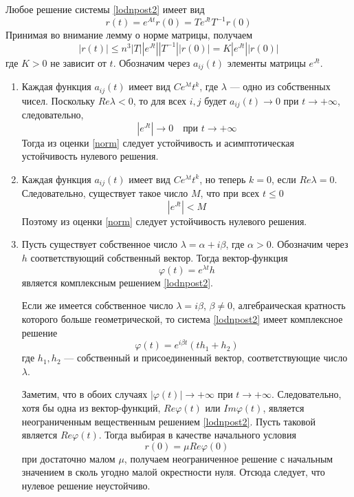 Любое решение системы \eqref{lodnpost2} имеет вид
\begin{equation*}
    r(t) = e^{At}r(0) = Te^{Jt}T^{-1}r(0)
\end{equation*}
Принимая во внимание лемму о норме матрицы, получаем
\begin{equation}
    |r(t)| \le n^3 |T||e^{Jt}||T^{-1}||r(0)| = K |e^{Jt}||r(0)| \label{norm}
\end{equation}
где $K > 0$ не зависит от $t$. Обозначим через $a_{ij}(t)$ элементы матрицы $e^{Jt}$.
\begin{enumerate}
    \item Каждая функция $a_{ij}(t)$ имеет вид $Ce^{\lambda t}t^k$, где $\lambda$ --- одно из собственных чисел. Поскольку $Re \lambda < 0$, то для всех $i, j$ будет $a_{ij}(t) \to 0$ при $t \to +\infty$, следовательно,
          \begin{equation*}
              |e^{Jt}| \to 0 \quad \text{при } t \to +\infty
          \end{equation*}
          Тогда из оценки \eqref{norm} следует устойчивость и асимптотическая устойчивость нулевого решения.
    \item Каждая функция $a_{ij}(t)$ имеет вид $Ce^{\lambda t}t^k$, но теперь $k = 0$, если $Re \lambda = 0$. Следовательно, существует такое число $M$, что при всех $t \le 0$
          \begin{equation*}
              |e^{Jt}| < M
          \end{equation*}
          Поэтому из оценки \eqref{norm} следует устойчивость нулевого решения.
    \item Пусть существует собственное число $\lambda = \alpha + i\beta$, где $\alpha > 0$. Обозначим через $h$ соответствующий собственный вектор. Тогда вектор-функция
          \begin{equation*}
              \varphi(t) = e^{\lambda t}h
          \end{equation*}
          является комплексным решением \eqref{lodnpost2}.

          Если же имеется собственное число $\lambda = i\beta$, $\beta \neq 0$, алгебраическая кратность которого больше геометрической, то система \eqref{lodnpost2} имеет комплексное решение
          \begin{equation*}
              \varphi(t) = e^{i\beta t}(th_1 + h_2)
          \end{equation*}
          где $h_1, h_2$ --- собственный и присоединенный вектор, соответствующие число $\lambda$.

          Заметим, что в обоих случаях $|\varphi(t)| \to +\infty$ при $t \to +\infty$. Следовательно, хотя бы одна из вектор-функций, $Re\varphi(t)$ или $Im\varphi(t)$, является неограниченным вещественным решением \eqref{lodnpost2}. Пусть таковой является $Re\varphi(t)$. Тогда выбирая в качестве начального условия
          \begin{equation*}
              r(0) = \mu Re\varphi(0)
          \end{equation*}
          при достаточно малом $\mu$, получаем неограниченное решение с начальным значением в сколь угодно малой окрестности нуля. Отсюда следует, что нулевое решение неустойчиво.
\end{enumerate}

